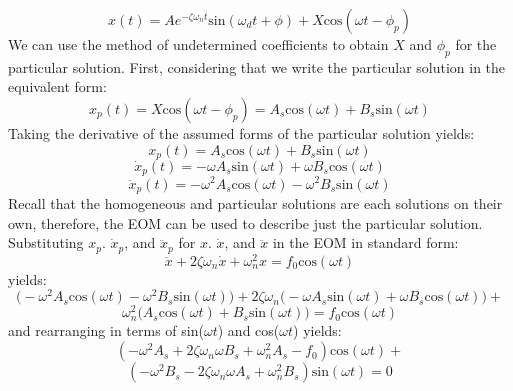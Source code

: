 \documentclass[12pt,letter]{article}
\begin{document}
	\begin{equation}
		x(t) = Ae^{-\zeta \omega_n t}\text{sin}(\omega_d t + \phi) +  X \text{cos}(\omega t - \phi_p)
	\end{equation}			
	We can use the method of undetermined coefficients to obtain $X$ and $\phi_p$ for the particular solution. First, considering that we write the particular solution in the equivalent form:
	\begin{equation}
		x_p(t) = X \text{cos}(\omega t - \phi_p) = A_s \text{cos}(\omega t) + B_s  \text{sin}(\omega t)
	\end{equation}			 
	Taking the derivative of the assumed forms of the particular solution yields:
	\begin{equation}
		x_p(t) = A_s \text{cos}(\omega t) + B_s  \text{sin}(\omega t)
	\end{equation}	
	\begin{equation}
		\dot{x}_p(t) = -\omega A_s \text{sin}(\omega t) + \omega B_s  \text{cos}(\omega t)
	\end{equation}				 
	\begin{equation}
		\ddot{x}_p(t) = -\omega^2 A_s \text{cos}(\omega t) - \omega^2 B_s  \text{sin}(\omega t)
	\end{equation}				
	Recall that the homogeneous and particular solutions are each solutions on their own, therefore, the EOM can be used to describe just the particular solution. Substituting $x_p$. $\dot{x}_p$, and $\ddot{x}_p$ for $x$. $\dot{x}$, and $\ddot{x}$ in the EOM in standard form:
	\begin{equation}
	 	\ddot{x}+2 \zeta \omega_n \dot{x} +\omega_n^2x = f_0\text{cos}(\omega t)
	\end{equation}
	yields:
	\begin{equation}
	 	\big(	-\omega^2 A_s \text{cos}(\omega t) - \omega^2 B_s  \text{sin}(\omega t) \big)+2 \zeta \omega_n  \big( -\omega A_s \text{sin}(\omega t) + \omega B_s  \text{cos}(\omega t)  \big) +
	\end{equation}
	\begin{equation*}
		\omega_n^2 \big( A_s \text{cos}(\omega t) + B_s  \text{sin}(\omega t) \big) = f_0\text{cos}(\omega t)
	\end{equation*}				
	and rearranging in terms of sin($\omega t$) and cos($\omega t$) yields: 
	\begin{equation}
		(-\omega^2 A_s + 2 \zeta \omega_n \omega B_s + \omega_n^2 A_s -f_0) \text{cos}(\omega t) + 
	\end{equation}
	\begin{equation*}
		(-\omega^2 B_s - 2 \zeta \omega_n \omega A_s + \omega_n^2 B_s)\text{sin}(\omega t) =0
	\end{equation*}	
\end{document}
